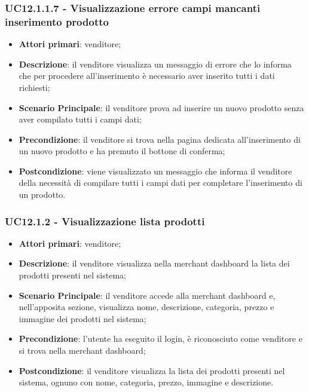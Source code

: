 \subsubsection{UC12.1.1.7 - Visualizzazione errore campi mancanti inserimento prodotto}
\begin{itemize}
\item \textbf{Attori primari}: venditore;
\item \textbf{Descrizione}: il venditore visualizza un messaggio di errore che lo informa che per procedere all'inserimento è necessario aver inserito tutti i dati richiesti;
\item \textbf{Scenario Principale}: il venditore prova ad inserire un nuovo prodotto senza aver compilato tutti i campi dati;
\item \textbf{Precondizione}: il venditore si trova nella pagina dedicata all'inserimento di un nuovo prodotto e ha premuto il bottone di conferma;
\item \textbf{Postcondizione}: viene visualizzato un messaggio che informa il venditore della necessità di compilare tutti i campi dati per completare l'inserimento di un prodotto.
\end{itemize}

\subsubsection{UC12.1.2 - Visualizzazione lista prodotti}
\begin{itemize}
\item \textbf{Attori primari}: venditore;
\item \textbf{Descrizione}: il venditore visualizza nella merchant dashboard la lista dei prodotti presenti nel sistema;
\item \textbf{Scenario Principale}: il venditore accede alla merchant dashboard e, nell'apposita sezione, visualizza nome, descrizione, categoria, prezzo e immagine dei prodotti nel sistema;
\item \textbf{Precondizione}: l'utente ha eseguito il login, è riconosciuto come venditore e si trova nella merchant dashboard;
\item \textbf{Postcondizione}: il venditore visualizza la lista dei prodotti presenti nel sistema, ognuno con nome, categoria, prezzo, immagine e descrizione.
\end{itemize}

